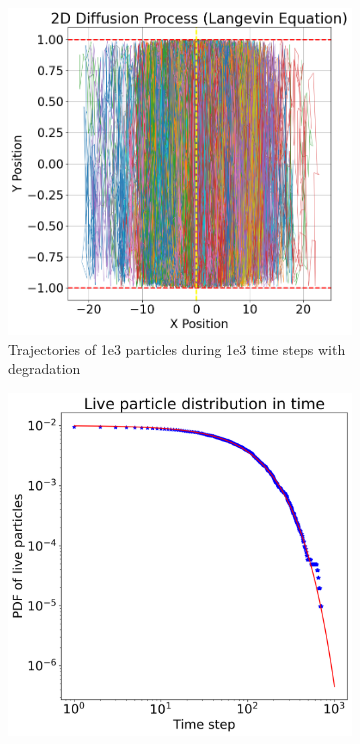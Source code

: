 \documentclass{article}
\begin{document}
\begin{figure}[htbp]
    \centering
    \begin{subfigure}[b]{0.45\textwidth}
        \centering
        \includegraphics[width=\textwidth]{images/trajectoriesDegradation.png} %
        \caption{Trajectories of 1e3 particles during 1e3 time steps with degradation}
        \label{fig:subplotTrDeg}
    \end{subfigure}
    \hfill
    \begin{subfigure}[b]{0.45\textwidth}
        \centering
        \includegraphics[width=\textwidth]{images/liveParticleInTime.png} %

\end{subfigure}
\end{figure}
\end{document}
